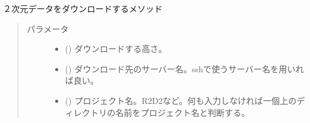 \documentclass[letterpaper,10pt,dvipdfmx,report]{sphinxmanual}
\begin{document}
\begin{fulllineitems}
\label{\detokenize{io:R2D2.R2D2_data.sync_select}}
２次元データをダウンロードするメソッド
\begin{quote}\begin{description}
\item[{パラメータ}] \leavevmode\begin{itemize}
\item {} 
 () \sphinxhyphen{}\sphinxhyphen{} ダウンロードする高さ。

\item {} 
 () \sphinxhyphen{}\sphinxhyphen{} ダウンロード先のサーバー名。sshで使うサーバー名を用いれば良い。

\item {} 
 () \sphinxhyphen{}\sphinxhyphen{} プロジェクト名。\textquotesingle{}R2D2\textquotesingle{}など。何も入力しなければ一個上のディレクトリの名前をプロジェクト名と判断する。

\end{itemize}

\end{description}\end{quote}

\end{fulllineitems}

\end{document}
